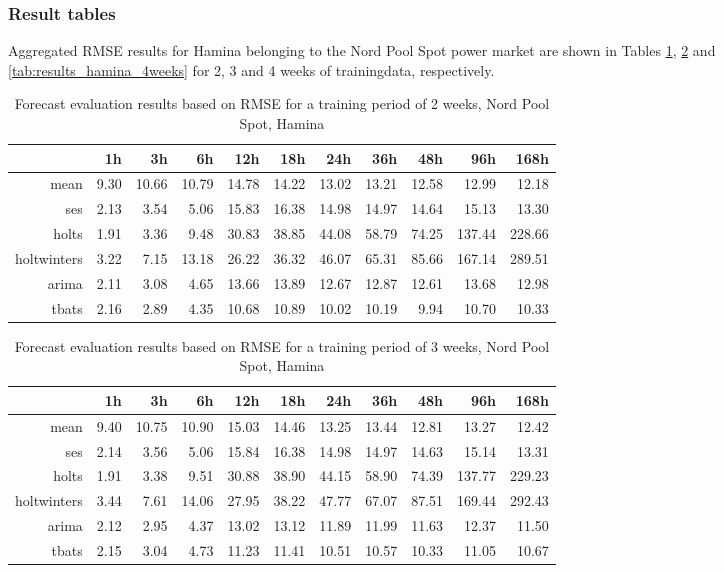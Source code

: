 \subsubsection{Result tables} \label{sssec:result_tables}

Aggregated RMSE results for Hamina belonging to the Nord Pool Spot power market are shown in Tables \ref{tab:results_hamina_2weeks}, \ref{tab:results_hamina_3weeks} and \ref{tab:results_hamina_4weeks} for 2, 3 and 4 weeks of trainingdata, respectively. 


\begin{table}[ht]
\centering
\begin{tabular}{rrrrrrrrrrr}
  \hline
 & 1h & 3h & 6h & 12h & 18h & 24h & 36h & 48h & 96h & 168h \\ 
  \hline
mean & 9.30 & 10.66 & 10.79 & 14.78 & 14.22 & 13.02 & 13.21 & 12.58 & 12.99 & 12.18 \\ 
  ses & 2.13 & 3.54 & 5.06 & 15.83 & 16.38 & 14.98 & 14.97 & 14.64 & 15.13 & 13.30 \\ 
  holts & 1.91 & 3.36 & 9.48 & 30.83 & 38.85 & 44.08 & 58.79 & 74.25 & 137.44 & 228.66 \\ 
  holtwinters & 3.22 & 7.15 & 13.18 & 26.22 & 36.32 & 46.07 & 65.31 & 85.66 & 167.14 & 289.51 \\ 
  arima & 2.11 & 3.08 & 4.65 & 13.66 & 13.89 & 12.67 & 12.87 & 12.61 & 13.68 & 12.98 \\ 
  tbats & 2.16 & 2.89 & 4.35 & 10.68 & 10.89 & 10.02 & 10.19 & 9.94 & 10.70 & 10.33 \\ 
   \hline
\end{tabular}
\caption{Forecast evaluation results based on RMSE for a training period of 2 weeks, Nord Pool Spot, Hamina}
\label{tab:results_hamina_2weeks}
\end{table}
\begin{table}[ht]
\centering
\begin{tabular}{rrrrrrrrrrr}
  \hline
 & 1h & 3h & 6h & 12h & 18h & 24h & 36h & 48h & 96h & 168h \\ 
  \hline
mean & 9.40 & 10.75 & 10.90 & 15.03 & 14.46 & 13.25 & 13.44 & 12.81 & 13.27 & 12.42 \\ 
  ses & 2.14 & 3.56 & 5.06 & 15.84 & 16.38 & 14.98 & 14.97 & 14.63 & 15.14 & 13.31 \\ 
  holts & 1.91 & 3.38 & 9.51 & 30.88 & 38.90 & 44.15 & 58.90 & 74.39 & 137.77 & 229.23 \\ 
  holtwinters & 3.44 & 7.61 & 14.06 & 27.95 & 38.22 & 47.77 & 67.07 & 87.51 & 169.44 & 292.43 \\ 
  arima & 2.12 & 2.95 & 4.37 & 13.02 & 13.12 & 11.89 & 11.99 & 11.63 & 12.37 & 11.50 \\ 
  tbats & 2.15 & 3.04 & 4.73 & 11.23 & 11.41 & 10.51 & 10.57 & 10.33 & 11.05 & 10.67 \\ 
   \hline
\end{tabular}
\caption{Forecast evaluation results based on RMSE for a training period of 3 weeks, Nord Pool Spot, Hamina}
\label{tab:results_hamina_3weeks}
\end{table}
